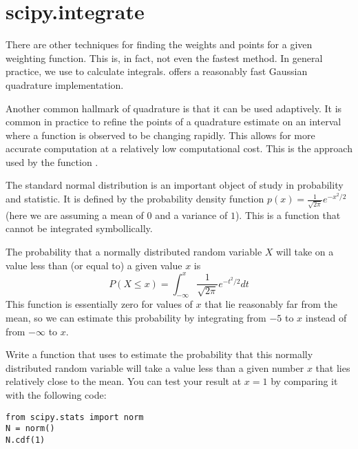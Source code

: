 
\section*{scipy.integrate}

There are other techniques for finding the weights and points for a given weighting function.
This is, in fact, not even the fastest method.
In general practice, we use  to calculate integrals.
 offers a reasonably fast Gaussian quadrature implementation.

Another common hallmark of quadrature is that it can be used adaptively.
It is common in practice to refine the points of a quadrature estimate on an interval where a function is observed to be changing rapidly.
This allows for more accurate computation at a relatively low computational cost.
This is the approach used by the function .

\begin{problem}
The standard normal distribution is an important object of study in probability and statistic.
It is defined by the probability density function $p(x) = \frac{1}{\sqrt{2 \pi}} e^{-x^2/2}$ (here we are assuming a mean of $0$ and a variance of $1$).
This is a function that cannot be integrated symbollically.

The probability that a normally distributed random variable $X$ will take on a value less than (or equal to) a given value $x$ is
\[P(X \le x) = \int_{-\infty}^x \frac{1}{\sqrt{2 \pi}} e^{-t^2/2} dt\]
This function is essentially zero for values of $x$ that lie reasonably far from the mean, so we can estimate this probability by integrating from $-5$ to $x$ instead of from $-\infty$ to $x$.

Write a function that uses  to estimate the probability that this normally distributed random variable will take a value less than a given number $x$ that lies relatively close to the mean.
You can test your result at $x = 1$ by comparing it with the following code:
\begin{lstlisting}
from scipy.stats import norm
N = norm()
N.cdf(1)
\end{lstlisting}
\end{problem}
